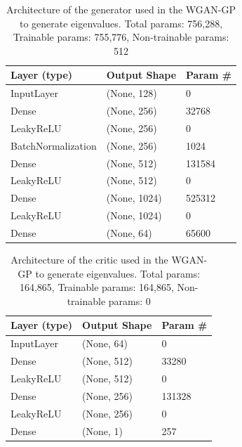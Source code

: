 \documentclass{article}
\begin{document}
\begin{table}[]
    \begin{tabular}{|l|l|l|}
        \hline
        \textbf{Layer (type)} & \textbf{Output Shape} & \textbf{Param \#} \\ \hline
        InputLayer            & (None, 128)           & 0                 \\ \hline
        Dense                 & (None, 256)           & 32768             \\ \hline
        LeakyReLU             & (None, 256)           & 0                 \\ \hline
        BatchNormalization    & (None, 256)           & 1024              \\ \hline
        Dense                 & (None, 512)           & 131584            \\ \hline
        LeakyReLU             & (None, 512)           & 0                 \\ \hline
        Dense                 & (None, 1024)          & 525312            \\ \hline
        LeakyReLU             & (None, 1024)          & 0                 \\ \hline
        Dense                 & (None, 64)            & 65600             \\ \hline
        \end{tabular}
    \caption{Architecture of the generator used in the WGAN-GP to generate eigenvalues. Total params: 756,288, Trainable params: 755,776, Non-trainable params: 512}
    \label{tab:evals_generator_WGANGP_architecture}
\end{table}

\begin{table}[]
    \begin{tabular}{|l|l|l|}
        \hline
        \textbf{Layer (type)} & \textbf{Output Shape} & \textbf{Param \#} \\ \hline
        InputLayer            & (None, 64)            & 0                 \\ \hline
        Dense                 & (None, 512)           & 33280             \\ \hline
        LeakyReLU             & (None, 512)           & 0                 \\ \hline
        Dense                 & (None, 256)           & 131328            \\ \hline
        LeakyReLU             & (None, 256)           & 0                 \\ \hline
        Dense                 & (None, 1)             & 257               \\ \hline
    \end{tabular}
    \caption{Architecture of the critic used in the WGAN-GP to generate eigenvalues. Total params: 164,865, Trainable params: 164,865, Non-trainable params: 0}
    \label{tab:evals_critic_WGANGP_architecture}
\end{table}
\end{document}
